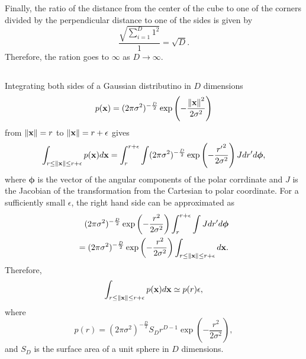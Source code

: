 Finally, the ratio of the distance from the center of the cube to one of the corners divided by the perpendicular distance to one of the sides is given by
%
\begin{equation}
\frac{\sqrt{\sum_{i = 1}^{D} 1 ^ 2}}{1} = \sqrt{D}.
\end{equation}
%
Therefore, the ration goes to $\infty$ as $D \to \infty$.


\subsection{}
Integrating both sides of a Gaussian distributino in $D$ dimensions
%
\begin{equation}
p(\mathbf{x}) = (2 \pi \sigma ^ 2) ^ {- \frac{D}{2}} \exp \left( - \frac{\norm{\mathbf{x}} ^ 2}{2 \sigma ^2} \right)
\end{equation}
%
from $\norm{\mathbf{x}} = r$ to $\norm{\mathbf{x}} = r + \epsilon$ gives
%
\begin{equation}
\int_{r \leq \norm{\mathbf{x}} \leq r + \epsilon} p(\mathbf{x}) d\mathbf{x} = \int_{r}^{r + \epsilon} \int (2 \pi \sigma ^ 2) ^ {- \frac{D}{2}} \exp \left( - \frac{{r'} ^ 2}{2 \sigma ^2} \right) J dr' d\bm{\phi},
\end{equation}
%
where $\bm{\phi}$ is the vector of the angular components of the polar corrdinate and $J$ is the Jacobian of the transformation from the Cartesian to polar coordinate.
For a sufficiently small $\epsilon$, the right hand side can be approximated as
%
\begin{equation}
\begin{aligned}
(2 \pi \sigma ^ 2) ^ {- \frac{D}{2}} \exp \left( - \frac{r ^ 2}{2 \sigma ^2} \right) \int_{r}^{r + \epsilon} \int J dr' d\bm{\phi} \\
= (2 \pi \sigma ^ 2) ^ {- \frac{D}{2}} \exp \left( - \frac{r ^ 2}{2 \sigma ^2} \right) \int_{r \leq \norm{\mathbf{x}} \leq r + \epsilon} d\mathbf{x}.
\end{aligned}
\end{equation}
%
Therefore,
%
\begin{equation}
\int_{r \leq \norm{\mathbf{x}} \leq r + \epsilon} p(\mathbf{x}) d\mathbf{x} \simeq p(r) \epsilon,
\end{equation}
%
where
%
\begin{equation}
p(r) = (2 \pi \sigma ^ 2) ^ {- \frac{D}{2}} S_D r ^ {D - 1} \exp \left( - \frac{r ^ 2}{2 \sigma ^2} \right),
\end{equation}
%
and $S_D$ is the surface area of a unit sphere in $D$ dimensions.

